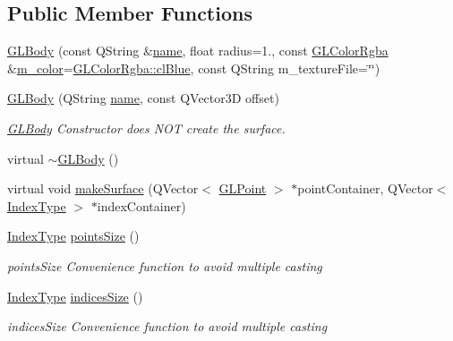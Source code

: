 \subsection*{Public Member Functions}
\begin{DoxyCompactItemize}
\item 
\mbox{\hyperlink{class_g_l_body_a86dd61f116bfd01d8f4d8656cfe1ddc9}{G\+L\+Body}} (const Q\+String \&\mbox{\hyperlink{class_g_l_body_af9f19479127cf12562fa0a2f9b5276f4}{name}}, float radius=1., const \mbox{\hyperlink{class_g_l_color_rgba}{G\+L\+Color\+Rgba}} \&\mbox{\hyperlink{class_g_l_body_a267b5c0fbe5752370197012975663dca}{m\+\_\+color}}=\mbox{\hyperlink{class_g_l_color_rgba_abf246bb4f542851d17ba84b5143a9214}{G\+L\+Color\+Rgba\+::cl\+Blue}}, const Q\+String m\+\_\+texture\+File=\char`\"{}\char`\"{})
\item 
\mbox{\hyperlink{class_g_l_body_a6e50d6cb10fbdb81e8aeb64ab3e46a66}{G\+L\+Body}} (Q\+String \mbox{\hyperlink{class_g_l_body_af9f19479127cf12562fa0a2f9b5276f4}{name}}, const Q\+Vector3D offset)
\begin{DoxyCompactList}\small\item\em \mbox{\hyperlink{class_g_l_body}{G\+L\+Body}} Constructor does N\+OT create the surface. \end{DoxyCompactList}\item 
virtual \mbox{\hyperlink{class_g_l_body_ac6cd2e5f6d0115cf6f6f0ae84c9d91a1}{$\sim$\+G\+L\+Body}} ()
\item 
virtual void \mbox{\hyperlink{class_g_l_body_a73e51b159f343d0bda87f50df382b7db}{make\+Surface}} (Q\+Vector$<$ \mbox{\hyperlink{class_g_l_point}{G\+L\+Point}} $>$ $\ast$point\+Container, Q\+Vector$<$ \mbox{\hyperlink{gldefines_8h_af3c748960f29c42e5b7f1dc449ab66ff}{Index\+Type}} $>$ $\ast$index\+Container)
\item 
\mbox{\hyperlink{gldefines_8h_af3c748960f29c42e5b7f1dc449ab66ff}{Index\+Type}} \mbox{\hyperlink{class_g_l_body_ab49318c0af2044a32ec6e7833a6224c1}{points\+Size}} ()
\begin{DoxyCompactList}\small\item\em points\+Size Convenience function to avoid multiple casting \end{DoxyCompactList}\item 
\mbox{\hyperlink{gldefines_8h_af3c748960f29c42e5b7f1dc449ab66ff}{Index\+Type}} \mbox{\hyperlink{class_g_l_body_a10511a36b5bc7012290252f84d40ac74}{indices\+Size}} ()
\begin{DoxyCompactList}\small\item\em indices\+Size Convenience function to avoid multiple casting \end{DoxyCompactList}\item 

\end{DoxyCompactItemize}
